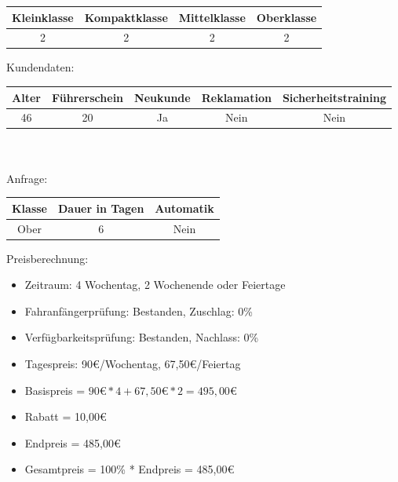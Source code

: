 \begin{tabular}{|c|c|c|c|}
	\hline \textbf{Kleinklasse} & \textbf{Kompaktklasse} & \textbf{Mittelklasse} & \textbf{Oberklasse}  \\ 
	\hline 2 & 2 & 2 & 2 \\ 
	\hline 
\end{tabular}

Kundendaten:\\
\begin{tabular}{|c|c|c|c|c|}
	\hline \textbf{Alter} & \textbf{Führerschein} & \textbf{Neukunde} & \textbf{Reklamation} & \textbf{Sicherheitstraining} \\ 
	\hline 46 & 20 & Ja & Nein & Nein \\ 
	\hline 
\end{tabular} 
\\\\
Anfrage:\\
\begin{tabular}{|c|c|c|}
	\hline \textbf{Klasse} & \textbf{Dauer in Tagen} & \textbf{Automatik} \\ 
	\hline Ober & 6 & Nein \\ 
	\hline 
\end{tabular}

Preisberechnung:
\begin{itemize}
	\item Zeitraum: 4 Wochentag, 2 Wochenende oder Feiertage
	\item Fahranfängerprüfung: Bestanden, Zuschlag: 0\%
	\item Verfügbarkeitsprüfung: Bestanden, Nachlass: 0\%
	
	\item Tagespreis: 90€/Wochentag, 67,50€/Feiertag
	\item Basispreis = $90€ * 4 + 67,50€ * 2 = 495,00€$
	\item Rabatt = 10,00€
	\item Endpreis = 485,00€
	\item Gesamtpreis = 100\% * Endpreis = 485,00€
	
\end{itemize}

